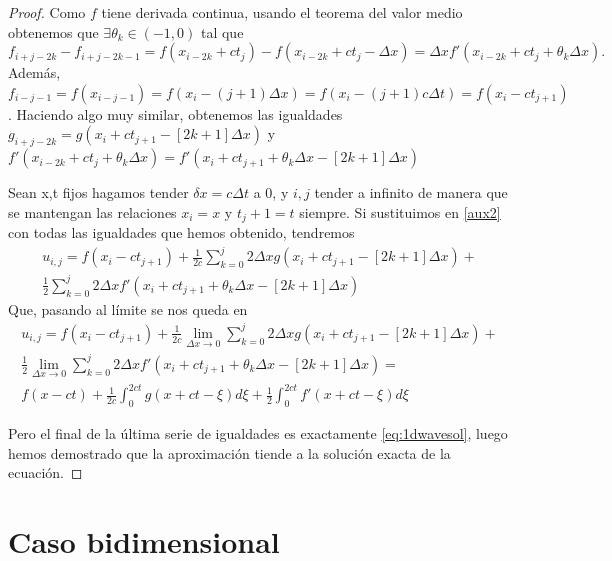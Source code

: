\begin{proof}
	Como $f$ tiene derivada continua, usando el teorema del valor medio obtenemos que $\exists\theta_k\in(-1,0)$ tal que
	\begin{equation}
		f_{i+j-2k}-f_{i+j-2k-1} = f(x_{i-2k}+ct_j) - f(x_{i-2k}+ct_{j}-\Delta x) = \Delta xf'(x_{i-2k}+ct_j+\theta_k\Delta x).
	\end{equation} 
	Además, $f_{i-j-1}=f(x_{i-j-1})=f(x_i-(j+1)\Delta x)=f(x_i -(j+1)c\Delta t)=f(x_i-ct_{j+1})$. Haciendo algo muy similar, obtenemos las igualdades $g_{i+j-2k}=g(x_i+ct_{j+1}-[2k+1]\Delta x)$ y $f'(x_{i-2k}+ct_j+\theta_k\Delta x)=f'(x_i+ct_{j+1}+\theta_k\Delta x - [2k+1]\Delta x)$
	
	Sean x,t fijos hagamos tender $\delta x=c\Delta t$ a 0, y $i,j$ tender a infinito de manera que se mantengan las relaciones $x_i=x$ y $t_j+1=t$ siempre.
	Si sustituimos en \ref{aux2} con todas las igualdades que hemos obtenido, tendremos
	\begin{equation}
	\begin{split}
		u_{i,j} = f(x_i-ct_{j+1}) + \frac{1}{2c}\sum_{k=0}^{j}2\Delta xg(x_i+ct_{j+1}-[2k+1]\Delta x) + \\ \frac{1}{2}\sum_{k=0}^{j}2\Delta xf'(x_i+ct_{j+1} +\theta_k\Delta x - [2k+1]\Delta x)
	\end{split}
	\end{equation}
	Que, pasando al límite se nos queda en
	\begin{equation}
	\begin{split}
		u_{i,j} = f(x_i-ct_{j+1}) + \frac{1}{2c}\lim_{\Delta x\rightarrow0}\sum_{k=0}^{j}2\Delta xg(x_i+ct_{j+1}-[2k+1]\Delta x) + \\ \frac{1}{2}\lim_{\Delta x\rightarrow0}\sum_{k=0}^{j}2\Delta xf'(x_i+ct_{j+1} +\theta_k\Delta x - [2k+1]\Delta x) = \\
		f(x-ct) + \frac{1}{2c}\int_{0}^{2ct}g(x+ct-\xi)d\xi + \frac{1}{2}\int_{0}^{2ct}f'(x+ct-\xi)d\xi
	\end{split}
	\end{equation}
	
	Pero el final de la última serie de igualdades es exactamente \eqref{eq:1dwavesol}, luego hemos demostrado que la aproximación tiende a la solución exacta de la ecuación.
\end{proof}

\section{Caso bidimensional}


